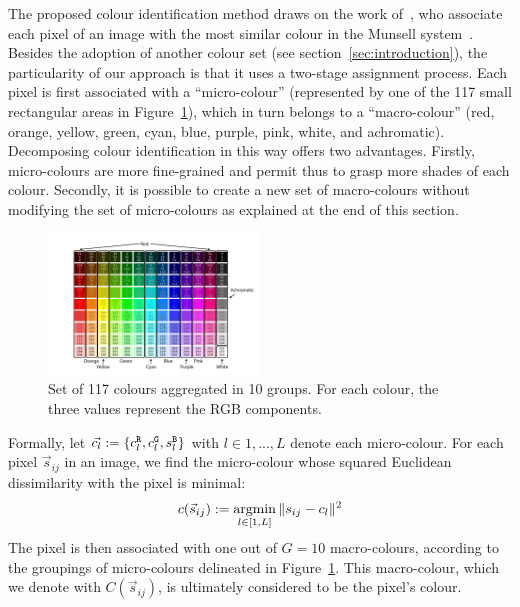\documentclass[11pt,a4paper]{article}
\begin{document}
The proposed colour identification method draws on the work of~\citet{kimbaelee2007}, who associate each pixel of an image with the most similar colour in the Munsell system~\cite{Munsell1912}. 
Besides the adoption of another colour set (see section~\ref{sec:introduction}), the particularity of our approach is that it uses a two-stage assignment process. Each pixel is first associated with a ``micro-colour'' (represented by one of the 117 small rectangular areas in Figure~\ref{fig:colour_set}), which in turn belongs to a ``macro-colour'' (red, orange, yellow, green, cyan, blue, purple, pink, white, and achromatic). Decomposing colour identification in this way offers two advantages. Firstly, micro-colours are more fine-grained and permit thus to grasp more shades of each colour.  Secondly, it is possible to create a new set of macro-colours without modifying the set of micro-colours as explained at the end of this section.

\begin{figure}
	\centering
	\includegraphics[width=0.5\textwidth]{figures/Col_tab.pdf}
	\caption{Set of 117 colours aggregated in 10 groups. For each colour, the three values represent the RGB components. \label{fig:colour_set}}
\end{figure}

Formally, let \(\vec{c_l} := \{ c^{\tt \scriptstyle R}_{l}, c^{\tt \scriptstyle G}_{l}, s^{\tt \scriptstyle B}_{l} \}\) with $l \in 1, ..., L$ denote each micro-colour. For each pixel \(\vec{s}_{ij}\) in an image, we find the micro-colour whose squared Euclidean dissimilarity with the pixel is minimal:
\begin{equation*}
c(\vec{s}_{ij}) := \operatornamewithlimits{argmin}_{l \in [1,L]} \| s_{ij} - c_{l} \|^{2}
\end{equation*}
The pixel is then associated with one out of $G = 10$ macro-colours, according to the groupings of micro-colours delineated in Figure~\ref{fig:colour_set}. This macro-colour, which we denote with $C(\vec{s}_{ij})$, is ultimately considered to be the pixel's colour.
\end{document}
